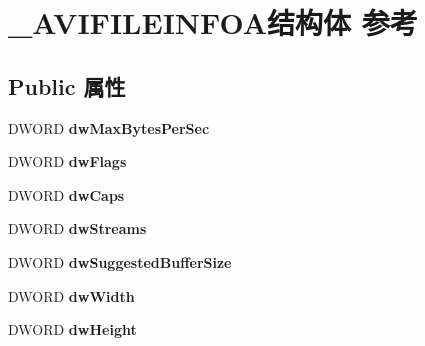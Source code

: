 \hypertarget{struct___a_v_i_f_i_l_e_i_n_f_o_a}{}\section{\+\_\+\+A\+V\+I\+F\+I\+L\+E\+I\+N\+F\+O\+A结构体 参考}
\label{struct___a_v_i_f_i_l_e_i_n_f_o_a}
\subsection*{Public 属性}
\begin{DoxyCompactItemize}
\item 
\mbox{\label{struct___a_v_i_f_i_l_e_i_n_f_o_a_a5ccfaf1bd66a5c1d5acc19b41b488f56}} 
D\+W\+O\+RD {\bfseries dw\+Max\+Bytes\+Per\+Sec}
\item 
\mbox{\label{struct___a_v_i_f_i_l_e_i_n_f_o_a_ae9e8e3e80757646eee911cc6234b4259}} 
D\+W\+O\+RD {\bfseries dw\+Flags}
\item 
\mbox{\label{struct___a_v_i_f_i_l_e_i_n_f_o_a_a06e40e6832d6df98ce1376cdb99cc40b}} 
D\+W\+O\+RD {\bfseries dw\+Caps}
\item 
\mbox{\label{struct___a_v_i_f_i_l_e_i_n_f_o_a_ae12bc34df35dc9438c2b3c83613966d6}} 
D\+W\+O\+RD {\bfseries dw\+Streams}
\item 
\mbox{\label{struct___a_v_i_f_i_l_e_i_n_f_o_a_ae530cafa2a7cb538f05b5f21f794350b}} 
D\+W\+O\+RD {\bfseries dw\+Suggested\+Buffer\+Size}
\item 
\mbox{\label{struct___a_v_i_f_i_l_e_i_n_f_o_a_a7241bd6ce21d58ef0cc0b970ba080fea}} 
D\+W\+O\+RD {\bfseries dw\+Width}
\item 
\mbox{\label{struct___a_v_i_f_i_l_e_i_n_f_o_a_a75aa231d50ff2b3da621bbc7d2d9f62a}} 
D\+W\+O\+RD {\bfseries dw\+Height}
\item 
\mbox{\label{struct___a_v_i_f_i_l_e_i_n_f_o_a_a4609a6a1109ffa5c9bb176350b8d6e95}} 

\end{DoxyCompactItemize}
